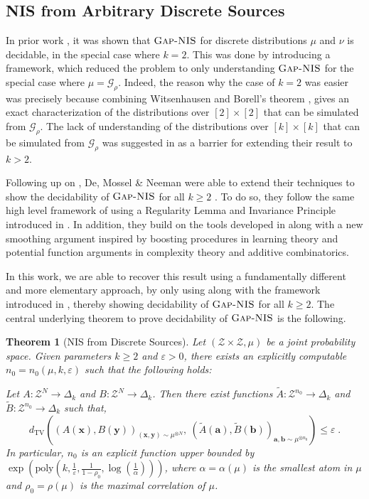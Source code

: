 \documentclass[11pt]{article}
\newcommand{\inparen}[1]{\left ( #1 \right )}
\newcommand{\wtilde}[1]{\widetilde{#1}}
\newcommand{\dTV}{d_{\mathrm{TV}}}
\newcommand{\eps}{\varepsilon}
\newcommand{\ba}{{\bm a}}
\newcommand{\bb}{{\bm b}}
\newcommand{\bx}{{\bm x}}
\newcommand{\by}{{\bm y}}
\newcommand{\calG}{\mathcal{G}}
\newcommand{\calZ}{\mathcal{Z}}
\newcommand{\poly}{\mathrm{poly}}
\newtheorem{theorem}{Theorem}[section]
\newcommand{\ANIS}{\text{\sc Gap-NIS}}
\begin{document}
\subsection{NIS from Arbitrary Discrete Sources}
In prior work \cite{GKS_NIS_decidable}, it was shown that $\ANIS$ for discrete distributions $\mu$ and $\nu$ is decidable, in the special case where $k = 2$. This was done by introducing a framework, which reduced the problem to only understanding $\ANIS$ for the special case where $\mu = \calG_\rho$. Indeed, the reason why the case of $k=2$ was easier was precisely because combining Witsenhausen \cite{witsenhausen1975sequences} and Borell's theorem \cite{borell1985geometric}, gives an exact characterization of the distributions over $[2] \times [2]$ that can be simulated from $\calG_\rho$. The lack of understanding of the distributions over $[k] \times [k]$ that can be simulated from $\calG_\rho$ was suggested in \cite{GKS_NIS_decidable} as a barrier for extending their result to $k > 2$.

Following up on \cite{DMN_NoiseStabilityComputable}, De, Mossel \& Neeman were able to extend their techniques to show the decidability of $\ANIS$ for all $k \ge 2$ \cite{DMN_NIS_decidable}. To do so, they follow the same high level framework of using a Regularity Lemma and Invariance Principle introduced in \cite{GKS_NIS_decidable}. In addition, they build on the tools developed in \cite{DMN_NoiseStabilityComputable} along with a new smoothing argument inspired by boosting procedures in learning theory and potential function arguments in complexity theory and additive combinatorics.

In this work, we are able to recover this result using a fundamentally different and more elementary approach, by only using  along with the framework introduced in \cite{GKS_NIS_decidable}, thereby showing decidability of $\ANIS$ for all $k \ge 2$. The central underlying theorem to prove decidability of $\ANIS$ is the following.

\begin{theorem}[NIS from Discrete Sources]\label{th:non-int-sim}
	Let $(\calZ \times \calZ, \mu)$ be a joint probability space. Given parameters $k \ge 2$ and $\eps > 0$, there exists an explicitly computable $n_0 = n_0(\mu, k, \eps)$ such that the following holds:
	
	Let $A : \calZ^N \to \Delta_k$ and $B : \calZ^N \to \Delta_k$. Then there exist functions $\wtilde{A} : \calZ^{n_0} \to \Delta_k$ and $\wtilde{B} : \calZ^{n_0} \to \Delta_k$ such that,
	\[\dTV\inparen{(A(\bx),B(\by))_{(\bx,\by)\sim \mu^{\otimes N}}, \ (\wtilde{A}(\ba), \wtilde{B}(\bb))_{\ba, \bb \sim \mu^{\otimes n_0}}} \le \eps\;.\]
	In particular, $n_0$ is an explicit function upper bounded by $\exp\inparen{\poly\inparen{k, \frac{1}{\eps}, \frac{1}{1-\rho_0}, \log\inparen{\frac{1}{\alpha}}}}$, where $\alpha = \alpha(\mu)$ is the smallest atom in $\mu$ and $\rho_0 = \rho(\mu)$ is the maximal correlation of $\mu$.
\end{theorem}
\end{document}
